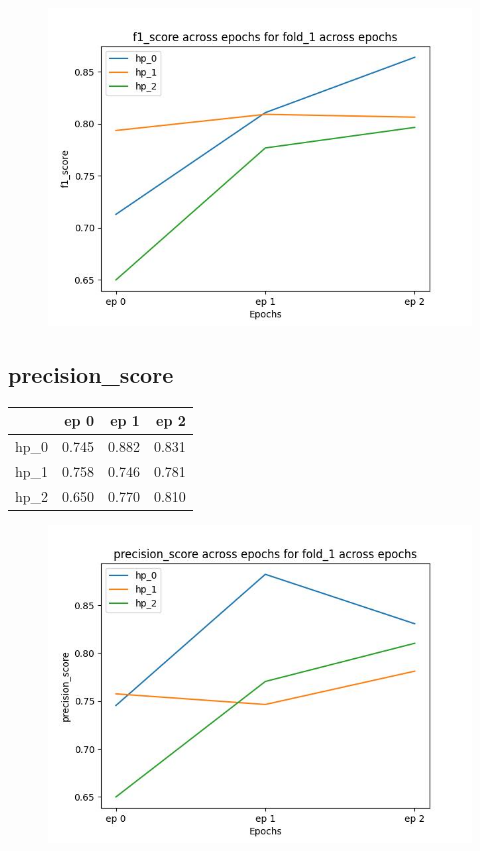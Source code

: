 \documentclass{article}
\begin{document}
\begin{figure}[H]
\includegraphics[scale = 0.75]{fold_1/f1_score}
\end{figure}
\subsection{precision\_score}
\begin{tabular}{lrrr}
\toprule
{} &   ep 0 &   ep 1 &   ep 2 \\
\midrule
hp\_0 &  0.745 &  0.882 &  0.831 \\
hp\_1 &  0.758 &  0.746 &  0.781 \\
hp\_2 &  0.650 &  0.770 &  0.810 \\
\bottomrule
\end{tabular}

\begin{figure}[H]
\includegraphics[scale = 0.75]{fold_1/precision_score}
\end{figure}
\end{document}
